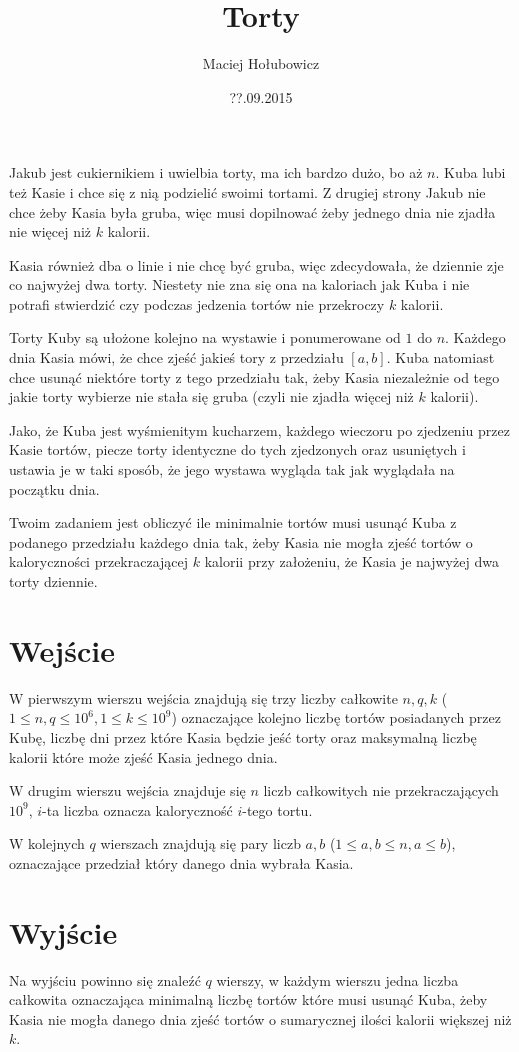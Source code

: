 \documentclass[zad,zawodnik,utf8]{sinol}
\title{Torty}
\author{Maciej Hołubowicz} %
\date{??.09.2015}
\begin{document}
\begin{tasktext}%
Jakub jest cukiernikiem i uwielbia torty, ma ich bardzo dużo, bo aż $n$. Kuba lubi też Kasie i chce się z nią podzielić swoimi tortami. Z drugiej strony Jakub nie chce żeby Kasia była gruba, więc musi dopilnować żeby jednego dnia nie zjadła nie więcej niż $k$ kalorii.

Kasia również dba o linie i nie chcę być gruba, więc zdecydowała, że dziennie zje co najwyżej dwa torty. Niestety nie zna się ona na kaloriach jak Kuba i nie potrafi stwierdzić czy podczas jedzenia tortów nie przekroczy $k$ kalorii.

Torty Kuby są ułożone kolejno na wystawie i ponumerowane od $1$ do $n$.
Każdego dnia Kasia mówi, że chce zjeść jakieś tory z przedziału $[a,b]$. Kuba natomiast chce usunąć niektóre torty z tego przedziału tak, żeby Kasia niezależnie od tego jakie torty wybierze nie stała się gruba (czyli nie zjadła więcej niż $k$ kalorii). 

Jako, że Kuba jest wyśmienitym kucharzem, każdego wieczoru po zjedzeniu przez Kasie tortów, piecze torty identyczne do tych zjedzonych oraz usuniętych i ustawia je w taki sposób, że jego wystawa wygląda tak jak wyglądała na początku dnia.

Twoim zadaniem jest obliczyć ile minimalnie tortów musi usunąć Kuba z podanego przedziału każdego dnia tak, żeby Kasia nie mogła zjeść tortów o kaloryczności przekraczającej $k$ kalorii przy założeniu, że Kasia je najwyżej dwa torty dziennie.

  \section{Wejście}
W pierwszym wierszu wejścia znajdują się trzy liczby całkowite $n, q, k$ ($1 \leq n, q \leq 10^6, 1 \leq k \leq 10^9$) oznaczające kolejno liczbę tortów posiadanych przez Kubę, liczbę dni przez które Kasia będzie jeść torty oraz maksymalną liczbę kalorii które może zjeść Kasia jednego dnia.

W drugim wierszu wejścia znajduje się $n$ liczb całkowitych nie przekraczających $10^9$, $i$-ta liczba oznacza kaloryczność $i$-tego tortu.

W kolejnych $q$ wierszach znajdują się pary liczb $a, b$ ($1 \leq a, b \leq n, a \leq b$), oznaczające przedział który danego dnia wybrała Kasia.

  \section{Wyjście}
Na wyjściu powinno się znaleźć $q$ wierszy, w każdym wierszu jedna liczba całkowita oznaczająca minimalną liczbę tortów które musi usunąć Kuba, żeby Kasia nie mogła danego dnia zjeść tortów o sumarycznej ilości kalorii większej niż $k$. 

\makecompactexample

\end{tasktext}
\end{document}
